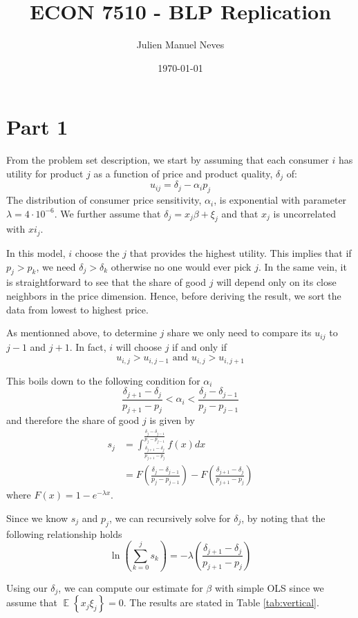 \documentclass[12pt]{article}
\title{ECON 7510 - BLP Replication}
\date{\today}
\author{Julien Manuel Neves}
\newcommand{\1}{{\bf 1}} %
\DeclareMathOperator{\E}{\mathbb{E}} %
\newcommand{\Ex}[1]{\E\left\{#1\right\}} %
\begin{document}
\maketitle

\section*{Part 1}

From the problem set description, we start by assuming that each consumer $i$
has utility for product $j$ as a function of price and product quality, $\delta_j$ of:
\[
u_{ij} =\delta_j -\alpha_i p_j
\]
The distribution of consumer price sensitivity, $\alpha_i$, is exponential with parameter $\lambda = 4\cdot 10^{-6}$. We further assume that $\delta_j = x_j\beta +\xi_j$ and that $x_j$ is uncorrelated with $xi_j$.

In this model, $i$ choose the $j$ that provides the highest utility. This implies that if $p_j>p_k$, we need $\delta_j>\delta_k$ otherwise no one would ever pick $j$. In the same vein, it is straightforward to see that the share of good $j$ will depend only on its close neighbors in the price dimension. Hence, before deriving the result, we sort the data from lowest to highest price.

As mentionned above, to determine $j$ share we only need to compare its $u_{ij}$ to $j-1$ and $j+1$. In fact, $i$ will choose $j$ if and only if
\[
u_{i,j}>u_{i,j-1} \text{ and } u_{i,j}>u_{i,j+1}
\]

This boils down to the following condition for $\alpha_i$
\[
\frac{\delta_{j+1}-\delta_{j}}{p_{j+1}-p_{j}}<\alpha_i<\frac{\delta_j-\delta_{j-1}}{p_j-p_{j-1}}
\]
and therefore the share of good $j$ is given by
\begin{align*}
	s_j&=\int_{\frac{\delta_{j+1}-\delta_{j}}{p_{j+1}-p_{j}}}^{\frac{\delta_j-\delta_{j-1}}{p_j-p_{j-1}}}f(x)dx\\
	& = F\left({\frac{\delta_j-\delta_{j-1}}{p_j-p_{j-1}}}\right) - F\left( {\frac{\delta_{j+1}-\delta_{j}}{p_{j+1}-p_{j}}}\right)
\end{align*}
where $F(x)= 1-e^{-\lambda x}$.

Since we know $s_j$ and $p_j$, we can recursively solve for $\delta_j$, by noting that the following relationship holds
\[
\ln\left(\sum_{k=0}^j s_k\right) = -\lambda \left({\frac{\delta_{j+1}-\delta_{j}}{p_{j+1}-p_{j}}}\right)
\]

Using our $\delta_j$, we can compute our estimate for $\beta$ with simple OLS since we assume that $\Ex{x_j\xi_j}=0$. The results are stated in Table \ref{tab:vertical}.
\end{document}
